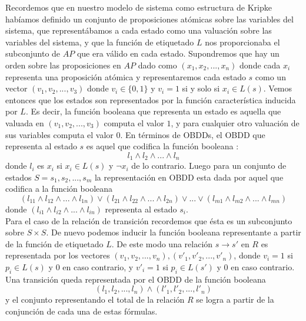 \documentclass[titlepage, 12pt]{book}
\begin{document}
Recordemos que en nuestro modelo de sistema como estructura de Kripke hab\'iamos definido un conjunto de proposiciones at\'omicas sobre las variables del sistema, que represent\'abamos a cada estado como una valuaci\'on sobre las variables del sistema, y que la funci\'on de etiquetado $L$ nos proporcionaba el subconjunto de $AP$ que era v\'alido en cada estado. Supondremos que hay un orden sobre las proposiciones en $AP$ dado como $(x_1,x_2,...,x_n)$ donde cada $x_i$ representa una proposici\'on at\'omica y representaremos cada estado $s$ como un vector $(v_1,v_2,...,v_3)$ donde $v_i \in \lbrace 0,1 \rbrace$ y $v_i = 1$ si y solo si $x_i \in L(s)$. Vemos entonces que los estados son representados por la funci\'on caracter\'istica inducida por $L$. Es decir, la funci\'on booleana que representa un estado es aquella que valuada en $(v_1,v_2,...,v_3)$ computa el valor $1$, y para cualquier otro valuaci\'on de sus variables computa el valor $0$. En t\'erminos de OBDDs, el OBDD que representa al estado $s$ es aquel que codifica la funci\'on booleana : $$l_1 \wedge l_2 \wedge ... \wedge l_n$$ donde $l_i$ es $x_i$ si $x_i \in L(s)$ y $\neg x_i$ de lo contrario. Luego para un conjunto de estados $S = {s_1, s_2, ..., s_m}$ la representaci\'on en OBDD esta dada por aquel que codifica a la funci\'on booleana $$(l_{11} \wedge l_{12} \wedge ... \wedge l_{1n}) \vee (l_{21} \wedge l_{22} \wedge ... \wedge l_{2n}) \vee ... \vee (l_{m1} \wedge l_{m2} \wedge ... \wedge l_{mn})$$ donde $(l_{i1} \wedge l_{i2} \wedge ... \wedge l_{in})$ representa al estado $s_i$.\\

Para el caso de la relaci\'on de transici\'on recordemos que \'esta es un subconjunto sobre $S\times S$. De nuevo podemos inducir la funci\'on booleana representante a partir de la funci\'on de etiquetado $L$. De este modo una relaci\'on $s\rightarrow s'$ en $R$ es representada por los vectores $(v_1,v_2,...,v_n),(v'_1,v'_2,...,v'_n)$, donde $v_i = 1$ si $p_i \in L(s)$ y $0$ en caso contrario, y $v'_i = 1$ si $p_i \in L(s')$ y $0$ en caso contrario. Una transici\'on queda representada por el OBDD de la funci\'on booleana $$(l_1,l_2,...,l_n) \wedge (l'_1,l'_2,...,l'_n)$$ y el conjunto representando el total de la relaci\'on $R$ se logra a partir de la conjunci\'on de cada una de estas f\'ormulas.








\end{document}
